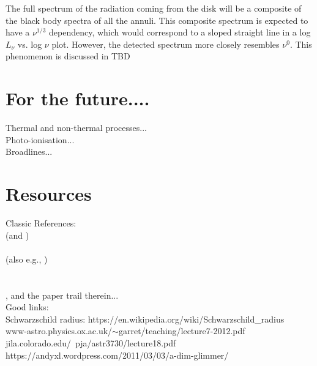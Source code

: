 \documentclass[11pt]{article}
\begin{document}
\noindent
The full spectrum of the radiation coming from the disk will be a composite of the black body spectra of all the annuli. This composite spectrum is expected to have a $\nu^{1/3}$ dependency, which would correspond to a sloped straight line in a log$L_{\nu}$ vs. log $\nu$ plot. However, the detected spectrum more closely resembles $\nu^0$. This phenomenon is discussed in \citet[e.g.][]{Kishimoto08} TBD\\


\clearpage
\section{For the future....}
Thermal and non-thermal processes...\\
Photo-ionisation...\\
Broadlines...\\



\clearpage
\section{Resources}
Classic References:\\
\citet{SS73} (and \citet{King09}) \\
\citet{Pringle81}\\
(also e.g., \citet{Pringle72, Pringle73, Pringle96})\\
\citet{Richards06b}\\
\citet{Kishimoto08}\\
\citet{Lawrence12}, and the paper trail therein...\\

\noindent
Good links:\\
Schwarzschild radius: https://en.wikipedia.org/wiki/Schwarzschild\_radius\\
www-astro.physics.ox.ac.uk/$\sim$garret/teaching/lecture7-2012.pdf\\
jila.colorado.edu/~pja/astr3730/lecture18.pdf\\
https://andyxl.wordpress.com/2011/03/03/a-dim-glimmer/\\





\end{document}
